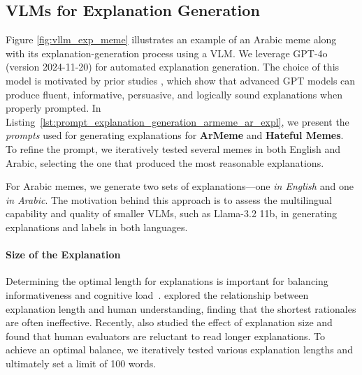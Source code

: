 %

\subsection{VLMs for Explanation Generation}
Figure \ref{fig:vllm_exp_meme} illustrates an example of an Arabic meme 
along with its explanation-generation process using a VLM. We leverage GPT-4o (version 2024-11-20) for automated explanation generation. The choice of this model is motivated by prior studies \citet{wang_evaluating_2023}, which show that advanced GPT models can produce fluent, informative, persuasive, and logically sound explanations when properly prompted. In Listing~\ref{lst:prompt_explanation_generation_armeme_ar_expl}, we present the \textit{prompts} used for generating explanations for \textbf{ArMeme} and \textbf{Hateful Memes}. To refine the prompt, we iteratively tested several memes in both English and Arabic, selecting the one that produced the most reasonable explanations.


For Arabic memes, we generate two sets of explanations—one \textit{in English} and one \textit{in Arabic}. The motivation behind this approach is to assess the multilingual capability and quality of smaller VLMs, such as Llama-3.2 11b, in generating explanations and labels in both languages. 
\color{black}




\paragraph{Size of the Explanation}
Determining the optimal length for explanations is important for balancing 
informativeness and cognitive load~\cite{herm2023impact}. 
\citet{shen2022shortest} explored the relationship between explanation length 
and human understanding, finding that the shortest rationales are often 
ineffective. Recently, \citet{wang_evaluating_2023} also studied the effect 
of explanation size and found that human evaluators are reluctant to read 
longer explanations. 
To achieve an optimal balance, we iteratively tested 
various explanation lengths and ultimately set a limit of 100 words.

